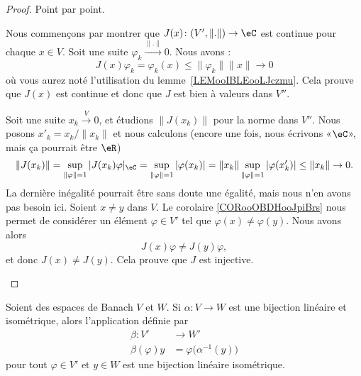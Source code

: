 \begin{proof}
	Point par point.
	\begin{subproof}
		\spitem[\ref{ITEMooNVVSooNFXgnE}]
		Nous commençons par montrer que \( J(x)\colon (V',\| . \|)\to \eC\) est continue pour chaque \( x\in V\). Soit une suite \( \varphi_k\stackrel{\| . \|}{\longrightarrow}0\). Nous avons :
		\begin{equation}
			J(x)\varphi_k=\varphi_k(x)\leq \| \varphi_k \|\| x \|\to 0
		\end{equation}
		où vous aurez noté l'utilisation du lemme~\ref{LEMooIBLEooLJczmu}.  Cela prouve que \( J(x)\) est continue et donc que \( J\) est bien à valeurs dans \( V''\).
		\spitem[\ref{ITEMooKURHooZZWpbu}]

		Soit une suite \( x_k\stackrel{V}{\longrightarrow}0\), et étudions \( \| J(x_k) \|\) pour la norme dans \( V''\). Nous posons \( x'_k=x_k/\| x_k \|\) et nous calculons (encore une fois, nous écrivons «\( \eC\)», mais ça pourrait être \( \eR\))
		\begin{equation}
			\| J(x_k) \|=\sup_{\| \varphi \|=1}| J(x_k)\varphi |_{\eC}=\sup_{\| \varphi \|=1}| \varphi(x_k) |=\| x_k \|\sup_{\| \varphi \|=1}| \varphi(x'_k) |\leq \| x_k \|\to 0.
		\end{equation}
		La dernière inégalité pourrait être sans doute une égalité, mais nous n'en avons pas besoin ici.
		\spitem[\ref{ITEMooTFYVooKhMOjp}]
		Soient \( x\neq y\) dans \( V\). Le corolaire \ref{CORooOBDHooJpiBrs} nous permet de considérer un élément \( \varphi\in V'\) tel que \( \varphi(x)\neq \varphi(y)\). Nous avons alors
		\begin{equation}
			J(x)\varphi\neq J(y)\varphi,
		\end{equation}
		et donc \( J(x)\neq J(y)\). Cela prouve que \( J\) est injective.
	\end{subproof}
\end{proof}

\begin{lemma}       \label{LEMooWEMFooEHIaxY}
	Soient des espaces de Banach \( V\) et \( W\). Si \( \alpha\colon V\to W\) est une bijection linéaire et isométrique, alors l'application définie par
	\begin{equation}        \label{EQooTSVHooEQGuNw}
		\begin{aligned}
			\beta\colon V'  & \to W'                             \\
			\beta(\varphi)y & =\varphi\big( \alpha^{-1}(y) \big)
		\end{aligned}
	\end{equation}
	pour tout \( \varphi\in V'\) et \( y\in W\) est une bijection linéaire isométrique.
\end{lemma}

